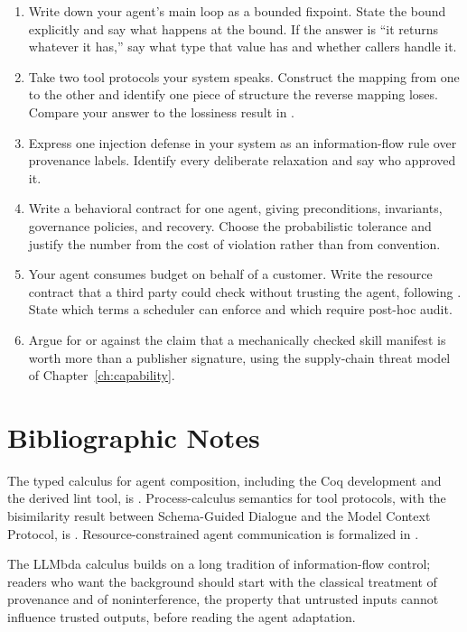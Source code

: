 \documentclass[11pt]{book}
\begin{document}
\begin{enumerate}
\item Write down your agent's main loop as a bounded fixpoint. State the bound explicitly and say what happens at the bound. If the answer is ``it returns whatever it has,'' say what type that value has and whether callers handle it.

\item Take two tool protocols your system speaks. Construct the mapping from one to the other and identify one piece of structure the reverse mapping loses. Compare your answer to the lossiness result in \cite{toolcalculus2026}.

\item Express one injection defense in your system as an information-flow rule over provenance labels. Identify every deliberate relaxation and say who approved it.

\item Write a behavioral contract for one agent, giving preconditions, invariants, governance policies, and recovery. Choose the probabilistic tolerance and justify the number from the cost of violation rather than from convention.

\item Your agent consumes budget on behalf of a customer. Write the resource contract that a third party could check without trusting the agent, following \cite{resourcecontracts2026}. State which terms a scheduler can enforce and which require post-hoc audit.

\item Argue for or against the claim that a mechanically checked skill manifest is worth more than a publisher signature, using the supply-chain threat model of Chapter~\ref{ch:capability}.
\end{enumerate}

\section*{Bibliographic Notes}

The typed calculus for agent composition, including the Coq development and the derived lint tool, is \cite{lambdaA2026}. Process-calculus semantics for tool protocols, with the bisimilarity result between Schema-Guided Dialogue and the Model Context Protocol, is \cite{toolcalculus2026}. Resource-constrained agent communication is formalized in \cite{uacp2026}.

The LLMbda calculus \cite{llmbda2026} builds on a long tradition of information-flow control; readers who want the background should start with the classical treatment of provenance and of noninterference, the property that untrusted inputs cannot influence trusted outputs, before reading the agent adaptation.
\end{document}
